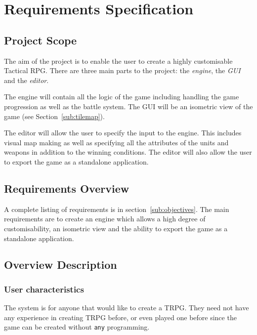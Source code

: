 \section{Requirements Specification}
\label{sec:requirements_specification}

\subsection{Project Scope}
\label{sub:project_scope}

The aim of the project is to enable the user to create a highly customisable Tactical RPG.  There are three main parts to the project: the \emph{engine}, the \emph{GUI} and the \emph{editor}.

The engine will contain all the logic of the game including handling the game progression as well as the battle system. The GUI will be an isometric view of the game (see Section~\ref{sub:tilemap}). 

The editor will allow the user to specify the input to the engine. This includes visual map making as well as specifying all the attributes of the units and weapons in addition to the winning conditions.  The editor will also allow the user to export the game as a standalone application.

\subsection{Requirements Overview}
\label{sub:overview}
A complete listing of requirements is in section~\ref{sub:objectives}. The main requirements are to create an engine which allows a high degree of customisability, an isometric view and the ability to export the game as a standalone application.  

\subsection{Overview Description}


\subsubsection{User characteristics}
The system is for anyone that would like to create a TRPG.  They need not have any experience in creating TRPG before, or even played one before since the game can be created without \texttt{any} programming. 

